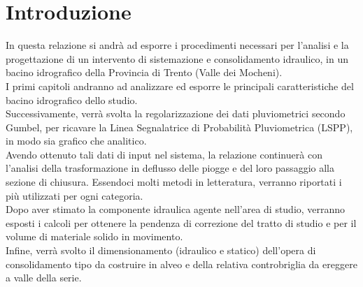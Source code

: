 \section{Introduzione}
In questa relazione si andrà ad esporre i procedimenti necessari per l'analisi e la progettazione di un intervento di sistemazione e consolidamento idraulico, in un bacino idrografico della Provincia di Trento (Valle dei Mocheni).\\
I primi capitoli andranno ad analizzare ed esporre le principali caratteristiche del bacino idrografico dello studio.\\
Successivamente, verrà svolta la regolarizzazione dei dati pluviometrici secondo Gumbel, per ricavare la Linea Segnalatrice di Probabilità Pluviometrica (LSPP), in modo sia grafico che analitico.\\ 
Avendo ottenuto tali dati di input nel sistema, la relazione continuerà con l'analisi della trasformazione in deflusso delle piogge e del loro passaggio alla sezione di chiusura. Essendoci molti metodi in letteratura, verranno riportati i più utilizzati per ogni categoria.\\
Dopo aver stimato la componente idraulica agente nell'area di studio, verranno esposti i calcoli per ottenere la pendenza di correzione del tratto di studio e per il volume di materiale solido in movimento.\\
Infine, verrà svolto il dimensionamento (idraulico e statico) dell'opera di consolidamento tipo da costruire in alveo e della relativa controbriglia da ereggere a valle della serie.
